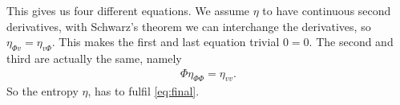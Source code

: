 This gives us four different equations. We assume $\eta$ to have continuous second derivatives, with Schwarz's theorem we can interchange the derivatives, so $\eta_{\Phi v} = \eta_{v\Phi}$. This makes the first and last equation trivial $0 = 0$. The second and third are actually the same, namely 
\begin{align}
\Phi \eta_{\Phi\Phi} = \eta_{vv}.\label{eq:final}
\end{align}
So the entropy $\eta$, has to fulfil \cref{eq:final}.